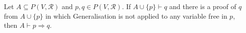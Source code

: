 Let $A \subseteq P(V, \mathcal{R})$ and $p, q \in P(V, \mathcal{R})$. If $A \cup \{p\} \vdash q$ and there is a proof of $q$ from $A \cup \{p\}$ in which Generalisation is not applied to any variable free in $p$, then $A \vdash p \Rightarrow q$.
